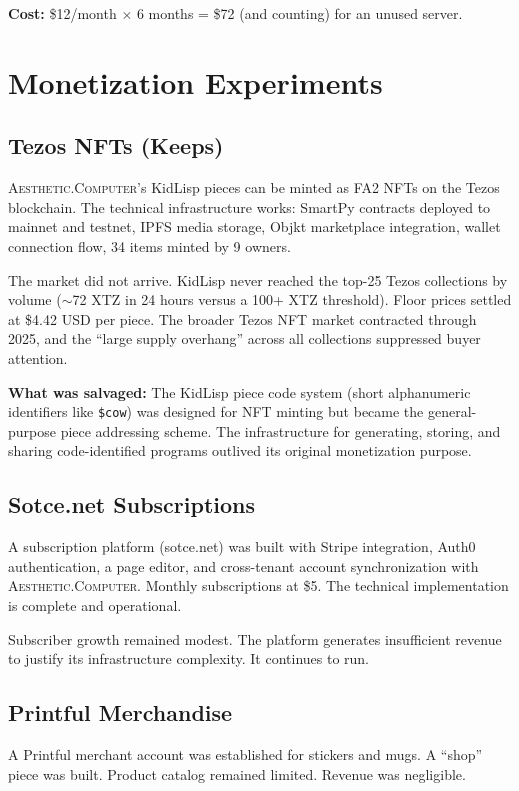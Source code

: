 \documentclass[10pt,letterpaper,twocolumn]{article}
\newcommand{\ac}{\textsc{Aesthetic.Computer}}
\begin{document}
\textbf{Cost:} \$12/month $\times$ 6 months = \$72 (and counting) for an unused server.

\section{Monetization Experiments}

\subsection{Tezos NFTs (Keeps)}

\ac{}'s KidLisp pieces can be minted as FA2 NFTs on the Tezos blockchain. The technical infrastructure works: SmartPy contracts deployed to mainnet and testnet, IPFS media storage, Objkt marketplace integration, wallet connection flow, 34 items minted by 9 owners.

The market did not arrive. KidLisp never reached the top-25 Tezos collections by volume ($\sim$72 XTZ in 24 hours versus a 100+ XTZ threshold). Floor prices settled at \$4.42 USD per piece. The broader Tezos NFT market contracted through 2025, and the ``large supply overhang'' across all collections suppressed buyer attention.

\textbf{What was salvaged:} The KidLisp piece code system (short alphanumeric identifiers like \texttt{\$cow}) was designed for NFT minting but became the general-purpose piece addressing scheme. The infrastructure for generating, storing, and sharing code-identified programs outlived its original monetization purpose.

\subsection{Sotce.net Subscriptions}

A subscription platform (sotce.net) was built with Stripe integration, Auth0 authentication, a page editor, and cross-tenant account synchronization with \ac{}. Monthly subscriptions at \$5. The technical implementation is complete and operational.

Subscriber growth remained modest. The platform generates insufficient revenue to justify its infrastructure complexity. It continues to run.

\subsection{Printful Merchandise}

A Printful merchant account was established for stickers and mugs. A ``shop'' piece was built. Product catalog remained limited. Revenue was negligible.
\end{document}
